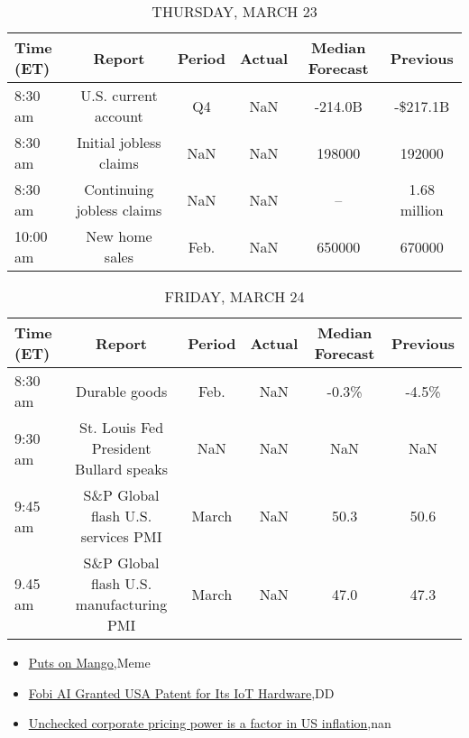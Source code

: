 \documentclass{article}%
\begin{document}
\begin{table}[htbp]%
\caption{THURSDAY, MARCH 23}%
\centering%
\begin{adjustbox}{width=1\textwidth}%
\begin{tabular}{lccccc}
\toprule
Time (ET) &                    Report & Period & Actual & Median Forecast &     Previous \\
\midrule
  8:30 am &      U.S. current account &     Q4 &    NaN &         -214.0B &     -\$217.1B \\
  8:30 am &    Initial jobless claims &    NaN &    NaN &          198000 &       192000 \\
  8:30 am & Continuing jobless claims &    NaN &    NaN &              -- & 1.68 million \\
 10:00 am &            New home sales &   Feb. &    NaN &          650000 &       670000 \\
\bottomrule
\end{tabular}
%
\end{adjustbox}%
\end{table}

%


\begin{table}[htbp]%
\caption{FRIDAY, MARCH 24}%
\centering%
\begin{adjustbox}{width=1\textwidth}%
\begin{tabular}{lccccc}
\toprule
Time (ET) &                                  Report & Period & Actual & Median Forecast & Previous \\
\midrule
  8:30 am &                           Durable goods &   Feb. &    NaN &           -0.3\% &    -4.5\% \\
  9:30 am &  St. Louis Fed President Bullard speaks &    NaN &    NaN &             NaN &      NaN \\
  9:45 am &      S\&P Global flash U.S. services PMI &  March &    NaN &            50.3 &     50.6 \\
  9.45 am & S\&P Global flash U.S. manufacturing PMI &  March &    NaN &            47.0 &     47.3 \\
\bottomrule
\end{tabular}
%
\end{adjustbox}%
\end{table}

%
\begin{itemize}%
\item%
\href{https://reddit.com/r/wallstreetbets/comments/11xff3h/puts\_on\_mango/}{Puts on Mango},Meme%
\item%
\href{https://reddit.com/r/Baystreetbets/comments/11xfprv/fobi\_ai\_granted\_usa\_patent\_for\_its\_iot\_hardware/}{Fobi AI Granted USA Patent for Its IoT Hardware},DD%
\item%
\href{https://reddit.com/r/Economics/comments/11xc516/unchecked\_corporate\_pricing\_power\_is\_a\_factor\_in/}{Unchecked corporate pricing power is a factor in US inflation},nan%
\end{itemize}%
\end{document}
